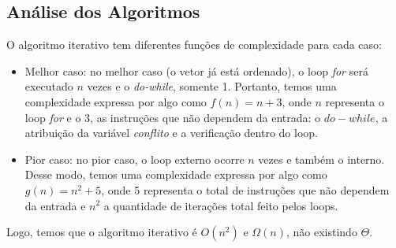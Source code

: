 \subsection{Análise dos Algoritmos}
O algoritmo iterativo tem diferentes funções de complexidade para cada caso:
\begin{itemize}
  \item Melhor caso: no melhor caso (o vetor já está ordenado), o loop \textit{for} será executado $n$ vezes e o \textit{do-while}, somente 1. Portanto, temos uma complexidade expressa por algo como $f(n) = n + 3$, onde $n$ representa o loop \textit{for} e o 3, as instruções que não dependem da entrada: o $do-while$, a atribuição da variável \textit{conflito} e a verificação dentro do loop.
  \item Pior caso: no pior caso, o loop externo ocorre $n$ vezes e também o interno. Desse modo, temos uma complexidade expressa por algo como $g(n) = n^2 + 5$, onde 5 representa o total de instruções que não dependem da entrada e $n^2$ a quantidade de iterações total feito pelos loops.
\end{itemize}

Logo, temos que o algoritmo iterativo é $O(n^2)$ e $\Omega(n)$, não existindo $\Theta$.
